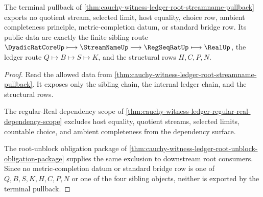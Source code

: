 \begin{theorem}
\label{thm:cauchy-witness-ledger-root-real-completion-nonescape}
The terminal pullback of \autoref{thm:cauchy-witness-ledger-root-streamname-pullback} exports no quotient stream, selected limit, host equality, choice row, ambient completeness principle, metric-completion datum, or standard bridge row. Its public data are exactly the finite sibling route $\DyadicRatCoreUp \longmapsto \StreamNameUp \longmapsto \RegSeqRatUp \longmapsto \RealUp$, the ledger route $Q \longmapsto B \longmapsto S \longmapsto K$, and the structural rows $H,C,P,N$.
\end{theorem}
\begin{proof}
Read the allowed data from \autoref{thm:cauchy-witness-ledger-root-streamname-pullback}. It exposes only the sibling chain, the internal ledger chain, and the structural rows.

The regular-Real dependency scope of \autoref{thm:cauchy-witness-ledger-regular-real-dependency-scope} excludes host equality, quotient streams, selected limits, countable choice, and ambient completeness from the dependency surface.

The root-unblock obligation package of \autoref{thm:cauchy-witness-ledger-root-unblock-obligation-package} supplies the same exclusion to downstream root consumers. Since no metric-completion datum or standard bridge row is one of $Q,B,S,K,H,C,P,N$ or one of the four sibling objects, neither is exported by the terminal pullback.
\end{proof}

